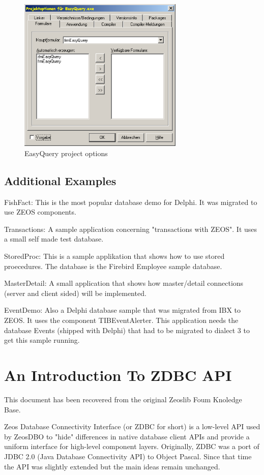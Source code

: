 \documentclass[a4paper,12pt,oneside]{book}
\begin{document}
\begin{figure}[htbp] 
  \centering
  \includegraphics[width=0.7\textwidth]{ZeosTutorial/EasyQuery_ProjectOptions.png}
  \caption{EasyQuery project options}
  \label{fig:EasyQuery_ProjectOptions}
\end{figure}

\section{Additional Examples}
FishFact:
This is the most popular database demo for Delphi. It was migrated to use ZEOS components.

Transactions:
A sample application concerning "transactions with ZEOS". It uses a small self made test database.

StoredProc:
This is a sample applikation that shows how to use stored proecedures. The database is the Firebird
Employee sample database.

MasterDetail:
A small application that shows how master/detail connections (server and client sided) will be implemented.

EventDemo:
Also a Delphi database sample that was migrated from IBX to ZEOS.
It uses the component TIBEventAlerter.
This application needs the database Events (shipped with Delphi) that had to be migrated to dialect 3 to get this sample running.

\chapter{An Introduction To ZDBC API}
This document has been recovered from the original Zeoslib Foum Knoledge Base.

Zeos Database Connectivity Interface (or ZDBC for short) is a low-level API used by ZeosDBO to "hide" differences in native database client APIs and provide a uniform interface for high-level component layers. Originally, ZDBC was a port of JDBC 2.0 (Java Database Connectivity API) to Object Pascal. Since that time the API was slightly extended but the main ideas remain unchanged.
\end{document}
